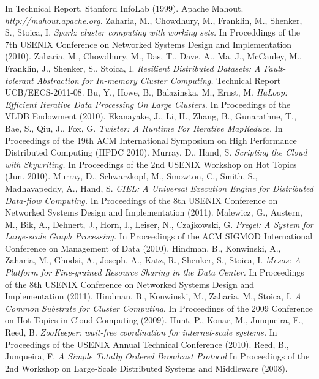 \documentclass[11pt,a4paper,twoside]{report}
\begin{document}
\begin{thebibliography}{23}
 In Technical Report, Stanford InfoLab (1999).
 Apache Mahout.
 {\em http://mahout.apache.org.}
 Zaharia, M., Chowdhury, M., Franklin, M., Shenker, S., Stoica, I.
 {\em Spark: cluster computing with working sets.}
 In Proceddings of the 7th USENIX Conference on Networked Systems Design and
 Implementation (2010).
 Zaharia, M., Chowdhury, M., Das, T., Dave, A., Ma, J., McCauley, M., Franklin,
 J., Shenker, S., Stoica, I.
 {\em Resilient Distributed Datasets: A Fault-tolerant Abstraction for In-memory
 Cluster Computing.}
 Technical Report UCB/EECS-2011-08.
 Bu, Y., Howe, B., Balazinska, M., Ernst, M.
 {\em HaLoop: Efficient Iterative Data Processing On Large Clusters.}
 In Proceedings of the VLDB Endowment (2010).
 Ekanayake, J., Li, H., Zhang, B., Gunarathne, T., Bae, S., Qiu, J., Fox, G.
 {\em Twister: A Runtime For Iterative MapReduce.}
 In Proceedings of the 19th ACM International Symposium on High Performance
 Distributed Computing (HPDC 2010).
 Murray, D., Hand, S.
 {\em Scripting the Cloud with Skywriting.}
 In Proceedings of the 2nd USENIX Workshop on Hot Topics (Jun. 2010).
 Murray, D., Schwarzkopf, M., Smowton, C., Smith, S., Madhavapeddy, A., Hand, S.
 {\em CIEL: A Universal Execution Engine for Distributed Data-flow Computing.}
 In Proceedings of the 8th USENIX Conference on Networked Systems Design and
 Implementation (2011).
 Malewicz, G., Austern, M., Bik, A., Dehnert, J., Horn, I., Leiser, N.,
 Czajkowski, G.
 {\em Pregel: A System for Large-scale Graph Processing.}
 In Proceedings of the ACM SIGMOD International Conference on Management of
 Data (2010).
 Hindman, B., Konwinski, A., Zaharia, M., Ghodsi, A., Joseph, A., Katz, R.,
 Shenker, S., Stoica, I.
 {\em Mesos: A Platform for Fine-grained Resource Sharing in the Data Center.}
 In Proceedings of the 8th USENIX Conference on Networked Systems Design and
 Implementation (2011).
 Hindman, B., Konwinski, M., Zaharia, M., Stoica, I.
 {\em A Common Substrate for Cluster Computing.}
 In Proceedings of the 2009 Conference on Hot Topics in Cloud Computing (2009).
 Hunt, P., Konar, M., Junqueira, F., Reed, B.
 {\em ZooKeeper: wait-free coordination for internet-scale systems.}
 In Proceedings of the USENIX Annual Technical Conference (2010).
 Reed, B., Junqueira, F.
 {\em A Simple Totally Ordered Broadcast Protocol}
 In Proceedings of the 2nd Workshop on Large-Scale Distributed Systems and Middleware (2008).

\end{thebibliography}
\end{document}
